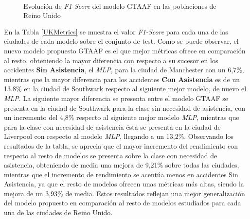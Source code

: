 \begin{figure}[H]
	\\
	\caption{Evolución de \textit{F1-Score} del modelo GTAAF en las poblaciones de Reino Unido}
	\label{UKLossFunction}
\end{figure}


En la Tabla \ref{UKMetrics} se muestra el valor \textit{F1-Score} para cada una de las ciudades de cada modelo sobre el conjunto de test. Como se puede observar, el nuevo modelo propuesto GTAAF es el que mejor métricas ofrece en comparación al resto, obteniendo la mayor diferencia con respecto a su sucesor en los accidentes \textbf{Sin Asistencia}, el \textit{MLP}, para la ciudad de Manchester con un 6,7\%, mientras que la mayor diferencia para los accidentes \textbf{Con Asistencia} es de un 13.8\% en la ciudad de Southwark respecto al siguiente mejor modelo, de nuevo el \textit{MLP}. La siguiente mayor diferencia se presenta entre el modelo GTAAF se presenta en la ciudad de Southwark para la clase sin necesidad de asistencia, con un incremento del 4,8\% respecto al siguiente mejor modelo \textit{MLP}, mientras que para la clase con necesidad de asistencia ésta se presenta en la ciudad de Liverpool con respecto al modelo \textit{MLP}, llegando a un 13,2\%. Observando los resultados de la tabla, se aprecia que el mayor incremento del rendimiento con respecto al resto de modelos se presenta sobre la clase con necesidad de asistencia, obteniendo de media una mejora de 9,21\% sobre todas las ciudades, mientras que el incremento de rendimiento se acentúa menos en accidentes Sin Asistencia, ya que el resto de modelos ofrecen unas métricas más altas, siendo la mejora de un 3,93\% de media. Estos resultados reflejan una mejor generalización del modelo propuesto en comparación al resto de modelos estudiados para cada una de las ciudades de Reino Unido.

